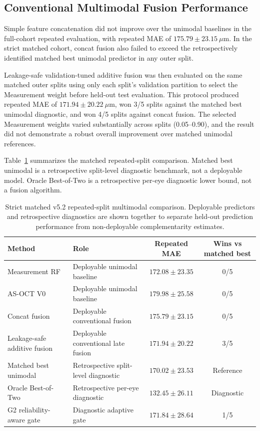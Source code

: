 \documentclass[10pt,twocolumn]{article}
\begin{document}
\subsection{Conventional Multimodal Fusion Performance}

Simple feature concatenation did not improve over the unimodal baselines in the full-cohort repeated evaluation, with repeated MAE of $175.79 \pm 23.15~\mu$m. In the strict matched cohort, concat fusion also failed to exceed the retrospectively identified matched best unimodal predictor in any outer split.

Leakage-safe validation-tuned additive fusion was then evaluated on the same matched outer splits using only each split's validation partition to select the Measurement weight before held-out test evaluation. This protocol produced repeated MAE of $171.94 \pm 20.22~\mu$m, won 3/5 splits against the matched best unimodal diagnostic, and won 4/5 splits against concat fusion. The selected Measurement weights varied substantially across splits (0.05--0.90), and the result did not demonstrate a robust overall improvement over matched unimodal references.

Table~\ref{tab:v52_matched} summarizes the matched repeated-split comparison. Matched best unimodal is a retrospective split-level diagnostic benchmark, not a deployable model. Oracle Best-of-Two is a retrospective per-eye diagnostic lower bound, not a fusion algorithm.

\begin{table}[t]
\centering
\caption{Strict matched v5.2 repeated-split multimodal comparison. Deployable predictors and retrospective diagnostics are shown together to separate held-out prediction performance from non-deployable complementarity estimates.}
\label{tab:v52_matched}
\footnotesize
\setlength{\tabcolsep}{4pt}
\begin{tabular}{llcc}
\toprule
Method & Role & Repeated MAE & Wins vs matched best \\
\midrule
Measurement RF & Deployable unimodal baseline & $172.08 \pm 23.35$ & 0/5 \\
AS-OCT V0 & Deployable unimodal baseline & $179.98 \pm 25.58$ & 0/5 \\
Concat fusion & Deployable conventional fusion & $175.79 \pm 23.15$ & 0/5 \\
Leakage-safe additive fusion & Deployable conventional late fusion & $171.94 \pm 20.22$ & 3/5 \\
Matched best unimodal & Retrospective split-level diagnostic & $170.02 \pm 23.53$ & Reference \\
Oracle Best-of-Two & Retrospective per-eye diagnostic & $132.45 \pm 26.11$ & Diagnostic \\
G2 reliability-aware gate & Diagnostic adaptive gate & $171.84 \pm 28.64$ & 1/5 \\
\bottomrule
\end{tabular}
\end{table}
\end{document}
